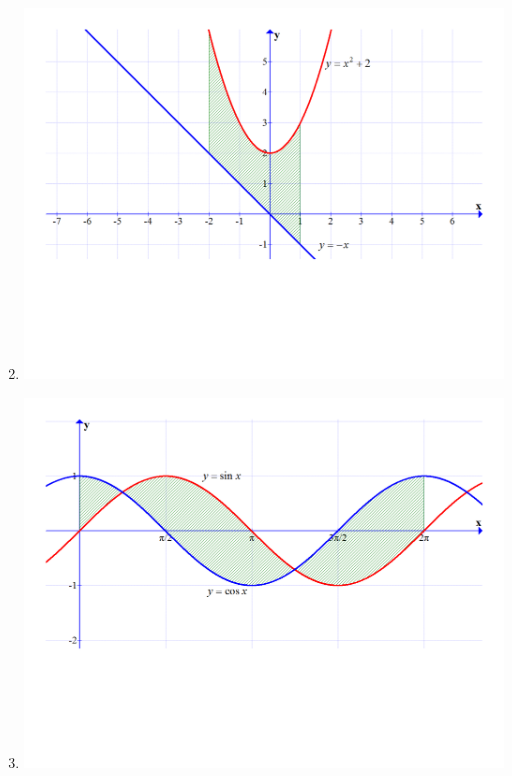 \documentclass[12pt]{article}
\newif\ifans
\begin{document}
\begin{enumerate}
\setcounter{enumi}{1}

\item \text{ }

\begin{center}

\includegraphics[scale=0.4]{graph1.pdf}

\ifans{\fbox{$A=\frac{15}{2}$}} \fi

\end{center}

\item \text{ }

\begin{center}

\includegraphics[scale=0.4]{graph2.pdf}


\end{center}
\end{enumerate}
\end{document}
